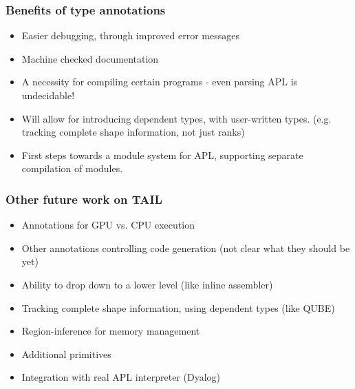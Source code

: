 \documentclass{beamer}
\begin{document}
\begin{frame}[fragile]
  \frametitle{Benefits of type annotations}

  \begin{itemize}
  \item Easier debugging, through improved error messages
  \item Machine checked documentation
  \item A necessity for compiling certain programs - even
    parsing APL is undecidable!
  \item Will allow for introducing dependent types, with user-written
    types. (e.g. tracking complete shape information, not just ranks)
  \item First steps towards a module system for APL, supporting
    separate compilation of modules.
  \end{itemize}

\end{frame}

\begin{frame}
  \frametitle{Other future work on TAIL}
  \begin{itemize}
  \item Annotations for GPU vs. CPU execution
  \item Other annotations controlling code generation (not clear what
    they should be yet)
  \item Ability to drop down to a lower level (like inline assembler)
  \item Tracking complete shape information, using dependent types
    (like QUBE)
  \item Region-inference for memory management
  \item Additional primitives
  \item Integration with real APL interpreter (Dyalog)
  \end{itemize}
\end{frame}
\end{document}
